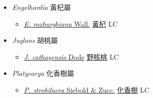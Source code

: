 
  \begin{itemize}
 \item[] \textit{Engelhardia} 黃杞屬
                    
  \begin{itemize}
        \item[] \href{http://www.theplantlist.org/tpl1.1/search?q=Engelhardia+roxburghiana}{\textit{E. roxburghiana} Wall.}   \href{\detokenize{http://taibnet.sinica.edu.tw/chi/taibnet_species_list.php?T2=黃杞&T2_new_value=true&fr=y}}{黃杞} LC
  \end{itemize}
 \item[] \textit{Juglans} 胡桃屬
                    
  \begin{itemize}
        \item[] \href{http://www.theplantlist.org/tpl1.1/search?q=Juglans+cathayensis}{\textit{J. cathayensis} Dode}   \href{\detokenize{http://taibnet.sinica.edu.tw/chi/taibnet_species_list.php?T2=野核桃&T2_new_value=true&fr=y}}{野核桃} LC
  \end{itemize}
 \item[] \textit{Platycarya} 化香樹屬
                    
  \begin{itemize}
        \item[] \href{http://www.theplantlist.org/tpl1.1/search?q=Platycarya+strobilacea}{\textit{P. strobilacea} Siebold \& Zucc.}   \href{\detokenize{http://taibnet.sinica.edu.tw/chi/taibnet_species_list.php?T2=化香樹&T2_new_value=true&fr=y}}{化香樹} LC
  \end{itemize}
  \end{itemize}
